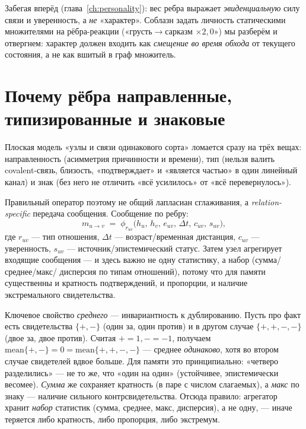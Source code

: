 \begin{intuition}
Забегая вперёд (глава~\ref{ch:personality}): вес ребра выражает
\emph{эвиденциальную} силу связи и уверенность, а \emph{не} «характер». Соблазн
задать личность статическими множителями на рёбра-реакции («грусть$\to$сарказм
$\times 2{,}0$») мы разберём и отвергнем: характер должен входить как
\emph{смещение во время обхода} от текущего состояния, а не как вшитый в граф
множитель.
\end{intuition}

\section{Почему рёбра направленные, типизированные и знаковые}

Плоская модель «узлы и связи одинакового сорта» ломается сразу на трёх вещах:
направленность (асимметрия причинности и времени), тип (нельзя валить covalent-связь,
близость, «подтверждает» и «является частью» в один линейный канал) и знак (без
него не отличить «всё усилилось» от «всё перевернулось»).

Правильный оператор поэтому не общий лапласиан сглаживания, а
\emph{relation-specific} передача сообщения. Сообщение по ребру:
\begin{equation}
m_{u\to v} \;=\; \phi_{r_{uv}}\!\big(h_u,\, h_v,\, e_{uv},\, \Delta t,\, c_{uv},\, s_{uv}\big),
\label{eq:message}
\end{equation}
где $r_{uv}$ — тип отношения, $\Delta t$ — возраст/временная дистанция, $c_{uv}$ —
уверенность, $s_{uv}$ — источник/эпистемический статус. Затем узел агрегирует
входящие сообщения — и здесь важно не одну статистику, а набор (сумма/среднее/макс/
дисперсия по типам отношений), потому что для памяти существенны и кратность
подтверждений, и пропорции, и наличие экстремального свидетельства.

\begin{workedbox}
Ключевое свойство \emph{среднего} — инвариантность к дублированию. Пусть про факт
есть свидетельства $\{+,-\}$ (один за, один против) и в другом случае
$\{+,+,-,-\}$ (двое за, двое против). Считая $+=1,-=-1$, получаем
$\mathrm{mean}\{+,-\}=0=\mathrm{mean}\{+,+,-,-\}$ — среднее \emph{одинаково}, хотя во
втором случае свидетелей вдвое больше. Для памяти это принципиально: «четверо
разделились» — не то же, что «один на один» (устойчивее, эпистемически весомее).
\emph{Сумма} же сохраняет кратность (в паре с числом слагаемых), а \emph{макс} по
знаку — наличие сильного контрсвидетельства. Отсюда правило: агрегатор хранит
\emph{набор} статистик (сумма, среднее, макс, дисперсия), а не одну, — иначе теряется
либо кратность, либо пропорция, либо экстремум.
\end{workedbox}

